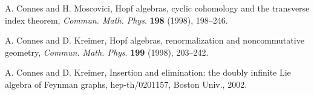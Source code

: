 \documentclass[a4paper,12pt]{article}
\newcommand{\1}{\mathbf{1}}         %
\newcommand{\7}{\dagger}            %
\newcommand{\8}{\bullet}            %
\renewcommand{\.}{\cdot}            %
\renewcommand{\:}{\colon}           %
\begin{document}
\begin{thebibliography}{74}
A. Connes and H. Moscovici,
Hopf algebras, cyclic cohomology and the transverse index theorem,
\textit{Commun. Math. Phys}. {\bf 198} (1998), 198--246.

A. Connes and D. Kreimer,
Hopf algebras, renormalization and noncommutative geometry,
\textit{Commun. Math. Phys}. {\bf 199} (1998), 203--242.

A. Connes and D. Kreimer,
Insertion and elimination: the doubly infinite Lie algebra of
Feynman graphs,
hep-th/0201157, Boston Univ., 2002.

\end{thebibliography}
\end{document}
